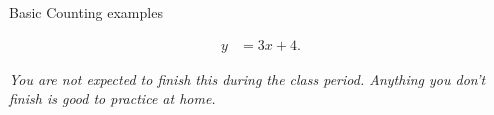 



\begin{problem}
\item Basic Counting examples

  \begin{subproblem}
  \item 
    \begin{eqnarray}
      y & = 3x + 4.
    \end{eqnarray}
    \vfill
  \end{subproblem}


\end{problem}



\textit{You are not expected to finish this during the class
  period. Anything you don't finish is good to practice at home.}

